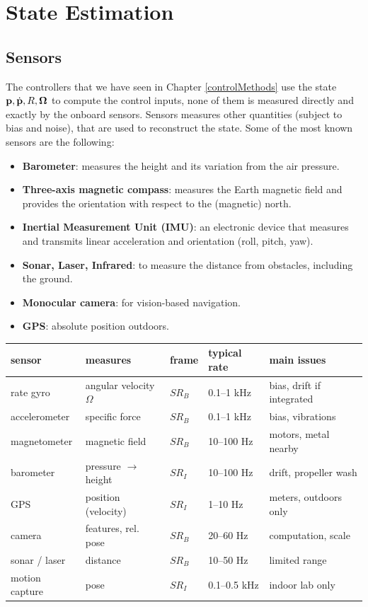 \documentclass[10pt, a4paper]{report}
\begin{document}
\chapter{State Estimation}
\section{Sensors}
The controllers that we have seen in Chapter \ref{controlMethods} use the state $\mathbf p,\dot{\mathbf p}, R,{\boldsymbol{\Omega}}$ to compute the control inputs, none of them is measured directly and exactly by the onboard
sensors. Sensors measures other quantities (subject to bias and noise), that are used to reconstruct the state. Some of the most known sensors are the following:\begin{itemize}
    \item \textbf{Barometer}: measures the height and its variation from the air pressure.
    \item \textbf{Three-axis magnetic compass}: measures the Earth magnetic field and provides
the orientation with respect to the (magnetic) north.
    \item \textbf{Inertial Measurement Unit (IMU)}:  an electronic device that measures and transmits linear acceleration and orientation (roll, pitch, yaw).
    \item \textbf{Sonar, Laser, Infrared}: to measure the distance from obstacles, including the ground.
    \item \textbf{Monocular camera}: for vision-based navigation.
    \item \textbf{GPS}: absolute position outdoors.
\end{itemize}
\begin{table}[htbp]
  \centering
  \renewcommand{\arraystretch}{1.35}
  \begin{tabular}{lllll}
    \toprule
    \textbf{sensor} & \textbf{measures} & \textbf{frame} & \textbf{typical rate} & \textbf{main issues} \\
    \midrule
    rate gyro      & angular velocity $\Omega$       & ${SR}_B$ & 0.1--1 kHz   & bias, drift if integrated \\
    accelerometer  & specific force                  & ${SR}_B$ & 0.1--1 kHz   & bias, vibrations \\
    magnetometer   & magnetic field                  & ${SR}_B$ & 10--100 Hz   & motors, metal nearby \\
    barometer      & pressure $\rightarrow$ height   & ${SR}_I$ & 10--100 Hz   & drift, propeller wash \\
    GPS            & position (velocity)             & ${SR}_I$ & 1--10 Hz     & meters, outdoors only \\
    camera         & features, rel. pose             & ${SR}_B$ & 20--60 Hz    & computation, scale \\
    sonar / laser  & distance                        & ${SR}_B$ & 10--50 Hz    & limited range \\
    motion capture & pose                            & ${SR}_I$ & 0.1--0.5 kHz & indoor lab only \\
    \bottomrule
  \end{tabular}
\end{table}
\end{document}

